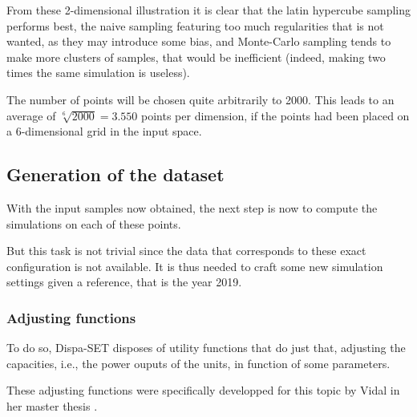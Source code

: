 From these 2-dimensional illustration it is clear that the latin hypercube sampling performs best, the naive sampling featuring too much regularities that is not wanted, as they may introduce some bias, and Monte-Carlo sampling tends to make more clusters of samples, that would be inefficient (indeed, making two times the same simulation is useless).

The number of points will be chosen quite arbitrarily to 2000. This leads to an average of $\sqrt[6]{2000} = 3.550$ points per dimension, if the points had been placed on a 6-dimensional grid in the input space. 

\subsection{Generation of the dataset}

With the input samples now obtained, the next step is now to compute the simulations on each of these points.

But this task is not trivial since the data that corresponds to these exact configuration is not available. It is thus needed to craft some new simulation settings given a reference, that is the year 2019.

\subsubsection{Adjusting functions}
To do so, Dispa-SET disposes of utility functions that do just that, adjusting the capacities, i.e., the power ouputs of the units, in function of some parameters.

These adjusting functions were specifically developped for this topic by Vidal in her master thesis \cite{carlas-thesis}.

